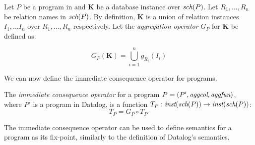 \begin{defn}
Let $P$ be a program in \datalogra and $\textbf{K}$ be a database instance over $\textit{sch}(P)$. Let $R_1, \dots, R_n$ be relation names in $\textit{sch}(P)$. By definition, $\textbf{K}$ is a union of relation instances $I_1, \dots I_n$ over $R_1, \dots, R_n$ respectively. %
Let the \emph{aggregation operator} $G_P$ for $\textbf{K}$ be defined as:

$$G_P(\textbf{K}) = \bigcup_{i = 1}^n g_{R_i}(I_i)$$

\end{defn}

We can now define the immediate consequence operator for \datalogra programs.

\begin{defn}
The \emph{immediate consequence operator} for a \datalogra program $P = (P', \textit{aggcol}, \textit{aggfun})$, where $P'$ is a program in Datalog, is a function $T_P: \textit{inst}(\textit{sch}(P)) \to \textit{inst}(\textit{sch}(P))$:
$$T_P = G_P \circ T_{P'}$$
\end{defn}

The immediate consequence operator can be used to define semantics for a \datalogra program as its fix-point, similarly to the definition of Datalog's semantics.

